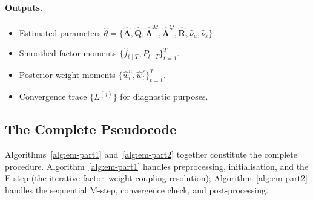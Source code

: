 \documentclass[11pt, a4paper, oneside]{article}
\newcommand{\mL}{\boldsymbol{\Lambda}}
\begin{document}
\paragraph{Outputs.}
\begin{itemize}[leftmargin=1.5em, itemsep=2pt]
    \item Estimated parameters
          $\hat{\theta} = \{\hat{\mathbf{A}}, \hat{\mathbf{Q}}, \hat{\mL}^M, \hat{\mL}^Q, \hat{\mathbf{R}}, \hat{\nu}_u, \hat{\nu}_\varepsilon\}$.
    \item Smoothed factor moments
          $\{\hat{f}_{t \mid T}, P_{t \mid T}\}_{t=1}^{T}$.
    \item Posterior weight moments
          $\{\hat{w}^u_t, \hat{w}^\varepsilon_t\}_{t=1}^{T}$.
    \item Convergence trace $\{L^{(j)}\}$ for diagnostic purposes.
\end{itemize}

\subsection{The Complete Pseudocode}
\label{subsec:pseudocode-main}

Algorithms~\ref{alg:em-part1} and~\ref{alg:em-part2} together
constitute the complete procedure. Algorithm~\ref{alg:em-part1}
handles preprocessing, initialisation, and the E-step (the iterative
factor–weight coupling resolution); Algorithm~\ref{alg:em-part2}
handles the sequential M-step, convergence check, and
post-processing.
\end{document}
